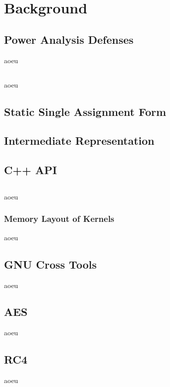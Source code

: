 \section{Background}
\label{background}
\subsection{Power Analysis Defenses}
aoeu

\subsection{\llvm{}}
\label{llvm}
aoeu

\subsection{Static Single Assignment Form}
\label{ssa}

\subsection{\llvm{} Intermediate Representation}
\label{ir}

\subsection{\llvm{} C++ API}
\label{api}

\subsection{\qemu{}}
aoeu
\subsubsection{Memory Layout of \qemu{} Kernels}
\label{memory}
aoeu

\subsection{GNU Cross Tools}
aoeu

\subsection{AES}
aoeu

\subsection{RC4}
aoeu
